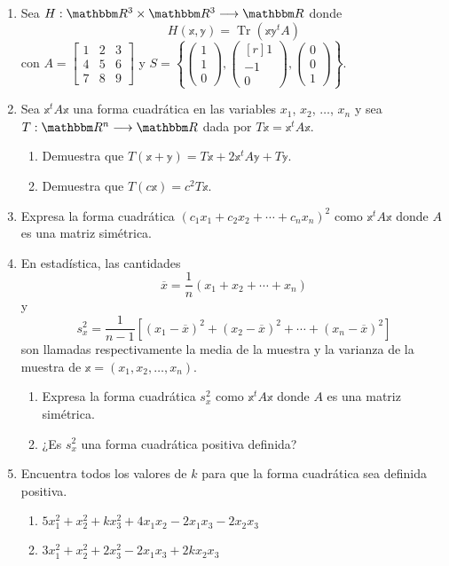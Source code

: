 \begin{enumerate}[resume]
    \item Sea $H:\RR[3] \times \RR[3] \longrightarrow \RR$ donde
    $$H(\mathbb{x}, \mathbb{y}) = \operatorname{Tr}(\mathbb{x}\mathbb{y}^tA)$$
    con $A = \begin{bmatrix} 1 & 2 & 3 \\ 4 & 5 & 6 \\ 7 & 8 & 9 \end{bmatrix}$ y $S = \left\{ \begin{pmatrix} 1 \\ 1 \\ 0 \end{pmatrix}, \begin{pmatrix*}[r] 1 \\ -1 \\ 0 \end{pmatrix*}, \begin{pmatrix} 0 \\ 0 \\ 1 \end{pmatrix} \right\}$.
    \item Sea $\mathbb{x}^tA\mathbb{x}$ una forma cuadrática en las variables $x_1$, $x_2$, $\dots$, $x_n$ y sea $T:\RR[n] \longrightarrow \RR$ dada por $T\mathbb{x} = \mathbb{x}^tA\mathbb{x}$.
    \begin{enumerate}
        \item Demuestra que $T(\mathbb{x} + \mathbb{y}) = T\mathbb{x} + 2\mathbb{x}^tA\mathbb{y} + T\mathbb{y}$.
        \item Demuestra que $T(c\mathbb{x}) = c^2 T\mathbb{x}$.
    \end{enumerate}\newpage
    \item Expresa la forma cuadrática $(c_1x_1 + c_2x_2 + \cdots + c_nx_n)^2$ como $\mathbb{x}^tA\mathbb{x}$ donde $A$ es una matriz simétrica.
    \item En estadística, las cantidades
    $$\overline{x} = \frac{1}{n} (x_1 + x_2 + \cdots + x_n)$$
    y
    $$s_x^2 = \frac{1}{n - 1} [(x_1 - \overline{x})^2 + (x_2 - \overline{x})^2 + \cdots + (x_n - \overline{x})^2 ]$$
    son llamadas respectivamente la media de la muestra y la varianza de la muestra de $\mathbb{x} = (x_1, x_2, \dots, x_n)$.
    \begin{enumerate}
        \item Expresa la forma cuadrática $s_x^2$ como $\mathbb{x}^tA\mathbb{x}$ donde $A$ es una matriz simétrica.
        \item ¿Es $s_x^2$ una forma cuadrática positiva definida?
    \end{enumerate}
    \item Encuentra todos los valores de $k$ para que la forma cuadrática sea definida positiva.
    \begin{enumerate}
        \item $5x_1^2 + x_2^2 + kx_3^2 + 4x_1x_2 - 2x_1x_3 - 2x_2x_3$
        \item $3x_1^2 + x_2^2 + 2x_3^2 - 2x_1x_3 + 2kx_2x_3$
    \end{enumerate}
\end{enumerate}

